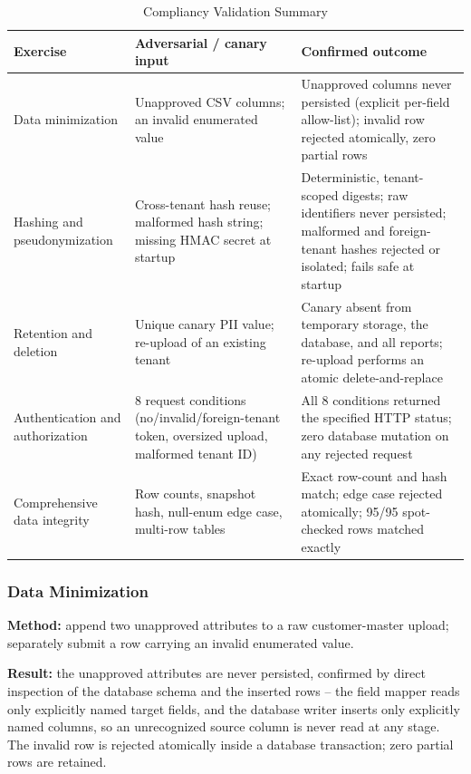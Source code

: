\documentclass[11pt,a4paper]{article}
\begin{document}
\begin{table}[htbp]
\caption{Compliancy Validation Summary}
\label{tab:sysval}
\centering
\scriptsize
\begin{tabularx}{\textwidth}{@{}p{28mm}p{55mm}Y@{}}
\toprule
Exercise & Adversarial / canary input & Confirmed outcome \\
\midrule
Data minimization & Unapproved CSV columns; an invalid enumerated value & Unapproved columns never persisted (explicit per-field allow-list); invalid row rejected atomically, zero partial rows \\
Hashing and pseudonymization & Cross-tenant hash reuse; malformed hash string; missing HMAC secret at startup & Deterministic, tenant-scoped digests; raw identifiers never persisted; malformed and foreign-tenant hashes rejected or isolated; fails safe at startup \\
Retention and deletion & Unique canary PII value; re-upload of an existing tenant & Canary absent from temporary storage, the database, and all reports; re-upload performs an atomic delete-and-replace \\
Authentication and authorization & 8 request conditions (no/invalid/foreign-tenant token, oversized upload, malformed tenant ID) & All 8 conditions returned the specified HTTP status; zero database mutation on any rejected request \\
Comprehensive data integrity & Row counts, snapshot hash, null-enum edge case, multi-row tables & Exact row-count and hash match; edge case rejected atomically; 95/95 spot-checked rows matched exactly \\
\bottomrule
\end{tabularx}
\end{table}

\subsubsection{Data Minimization}
\label{sec:dm}
\textbf{Method:} append two unapproved attributes to a raw customer-master upload; separately submit a row carrying an invalid enumerated value.

\textbf{Result:} the unapproved attributes are never persisted, confirmed by direct inspection of the database schema and the inserted rows -- the field mapper reads only explicitly named target fields, and the database writer inserts only explicitly named columns, so an unrecognized source column is never read at any stage. The invalid row is rejected atomically inside a database transaction; zero partial rows are retained.
\end{document}
